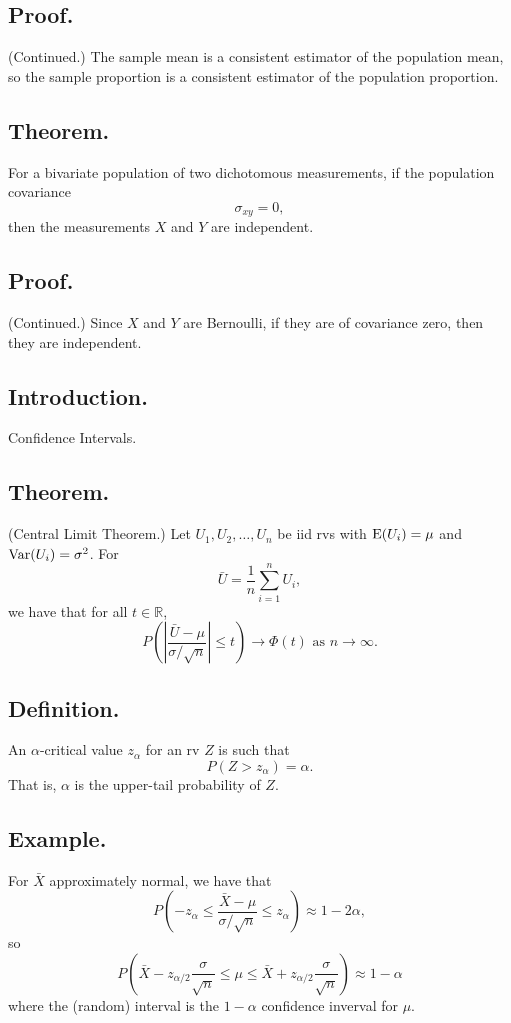 \documentclass[titlepage]{article}
\begin{document}
\subsection{Proof.} (Continued.) The sample mean is a consistent estimator of the population mean, so the sample proportion is a consistent estimator of the population proportion.

\subsection{Theorem.} For a bivariate population of two dichotomous measurements, if the population covariance 
$$\sigma_{xy} = 0,$$
then the measurements $X$ and $Y$ are independent.

\subsection{Proof.} (Continued.) Since $X$ and $Y$ are Bernoulli, if they are of covariance zero, then they are independent.

\newpage {}

\subsection{Introduction.} Confidence Intervals.

\subsection{Theorem.} (Central Limit Theorem.) Let $U_{1}, U_{2}, \ldots, U_{n}$ be iid rvs with $\text{E}(U_{i}) = \mu$ and $\text{Var}(U_{i}) = \sigma^{2}$. For $$\bar{U} = \frac{1}{n}\sum_{i=1}^{n}U_{i},$$
we have that for all $t \in \mathbb{R}$,
$$P\left(\left|\frac{\bar{U} - \mu}{\sigma/\sqrt{n}}\right| \leq t\right) \rightarrow \Phi(t) \text{ as } n \rightarrow \infty.$$

\subsection{Definition.} An $\alpha$-critical value $z_{\alpha}$ for an rv $Z$ is such that 
$$P(Z > z_{\alpha}) = \alpha.$$
That is, $\alpha$ is the upper-tail probability of $Z$.

\subsection{Example.} For $\bar{X}$ approximately normal, we have that 
$$P\left(-z_{\alpha} \leq \frac{\bar{X} - \mu}{\sigma/\sqrt{n}} \leq z_{\alpha}\right) \approx 1 - 2\alpha,$$
so
$$P\left(\bar{X} - z_{\alpha/2}\frac{\sigma}{\sqrt{n}} \leq \mu \leq \bar{X} + z_{\alpha/2}\frac{\sigma}{\sqrt{n}}\right) \approx 1 - \alpha$$
where the (random) interval is the $1-\alpha$ confidence inverval for $\mu$.
\end{document}
